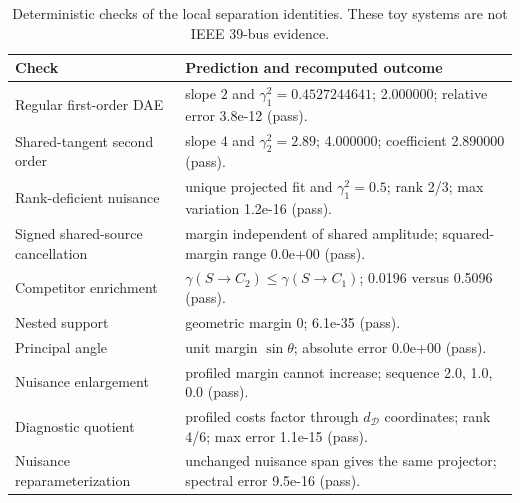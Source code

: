 \begin{table}[t]
\caption{Deterministic checks of the local separation identities. These toy systems are not IEEE 39-bus evidence.}
\label{tab:supp-controlled-theory-checks}
\centering
\scriptsize
\begin{tabularx}{\columnwidth}{@{}p{}X@{}}
\toprule
Check & Prediction and recomputed outcome \\
\midrule
Regular first-order DAE & slope $2$ and $\gamma_1^2=0.4527244641$; 2.000000; relative error 3.8e-12 (pass). \\
Shared-tangent second order & slope $4$ and $\gamma_2^2=2.89$; 4.000000; coefficient 2.890000 (pass). \\
Rank-deficient nuisance & unique projected fit and $\gamma_1^2=0.5$; rank 2/3; max variation 1.2e-16 (pass). \\
Signed shared-source cancellation & margin independent of shared amplitude; squared-margin range 0.0e+00 (pass). \\
Competitor enrichment & $\gamma(S\!\to\!C_2)\le\gamma(S\!\to\!C_1)$; 0.0196 versus 0.5096 (pass). \\
Nested support & geometric margin $0$; 6.1e-35 (pass). \\
Principal angle & unit margin $\sin\theta$; absolute error 0.0e+00 (pass). \\
Nuisance enlargement & profiled margin cannot increase; sequence 2.0, 1.0, 0.0 (pass). \\
Diagnostic quotient & profiled costs factor through $d_{\mathcal D}$ coordinates; rank 4/6; max error 1.1e-15 (pass). \\
Nuisance reparameterization & unchanged nuisance span gives the same projector; spectral error 9.5e-16 (pass). \\
\bottomrule
\end{tabularx}
\end{table}
